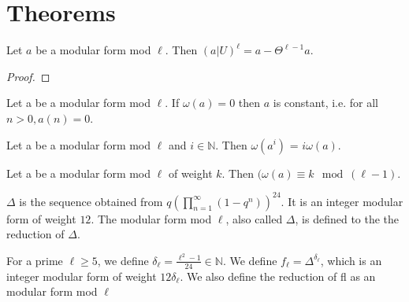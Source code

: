 \section{Theorems}

\begin{theorem}
  \label{thm:U_pow_l_eq_self_sub_Theta_pow_l_sub_one}
  \leanok
  Let $a$ be a modular form mod $\ell$. Then $(a|U) ^ \ell = a - \Theta^{\ell - 1} a$.
\end{theorem}
\begin{proof}
  \leanok
\end{proof}


\begin{lemma}
  \label{lem:const_of_Filt_zero}
  \leanok
  Let a be a modular form mod $\ell$. If $\omega (a) = 0$ then $a$ is constant, 
  i.e. for all $n > 0, a(n) = 0$.
\end{lemma}

\begin{theorem}
  \label{thm:Filtration_Log}
  \leanok
  Let a be a modular form mod $\ell$ and $i \in \mathbb{N}$. 
  Then $\omega (a ^ i)$ = $i \omega (a)$.
\end{theorem}

\begin{theorem}
  \label{thm:Filtration_congruence}
  \leanok
  Let a be a modular form mod $\ell$ of weight $k$. Then 
  $(\omega (a) \equiv k \mod (\ell - 1)$. 
\end{theorem}


\begin{definition}[Delta]
  \label{def:Delta}
  \leanok
  
  $\Delta$ is the sequence obtained from $q (\prod_{n = 1}^{\infty} (1 - q^n))^{24}$.
  It is an integer modular form of weight $12$. The modular form mod $\ell$, also called 
  $\Delta$, is defined to the the reduction of $\Delta$.
\end{definition}

\begin{definition}
  \label{def:fl}
  \leanok
  For a prime $\ell \ge 5$, we define $\delta_\ell = \frac{\ell^2 - 1}{24} \in \mathbb{N}$. 
  We define $f_\ell = \Delta^{\delta_\ell}$, which is an integer modular form of weight $12 \delta_\ell$. 
  We also define the reduction of fl as an modular form mod $\ell$
\end{definition}

